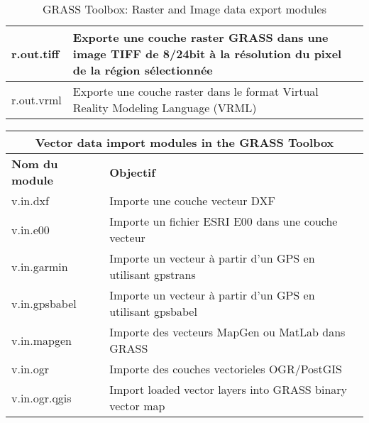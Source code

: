 \begin{table}[htb]
\begin{tabular}{|p{2.5cm}|p{11.5cm}|}
  \hline r.out.tiff & Exporte une couche raster GRASS dans une image TIFF de 8/24bit à la résolution du pixel de la région sélectionnée\\
  \hline r.out.vrml & Exporte une couche raster dans le format Virtual Reality Modeling Language (VRML)\\
\hline
\end{tabular}
\caption{GRASS Toolbox: Raster and Image data export modules}
\end{table}

\begin{table}[H]
\centering
 \begin{tabular}{|p{2.5cm}|p{11.5cm}|}
  \hline \multicolumn{2}{|c|}{\textbf{Vector data import modules in the GRASS
Toolbox}} \\
  \hline \textbf{Nom du module} & \textbf{Objectif} \\
  \hline v.in.dxf & Importe une couche vecteur DXF \\
  \hline v.in.e00 & Importe un fichier ESRI E00 dans une couche vecteur \\
  \hline v.in.garmin & Importe un vecteur à partir d'un GPS en utilisant gpstrans \\
  \hline v.in.gpsbabel & Importe un vecteur à partir d'un GPS en utilisant gpsbabel \\
  \hline v.in.mapgen & Importe des vecteurs MapGen ou MatLab dans GRASS \\
  \hline v.in.ogr & Importe des couches vectorieles OGR/PostGIS \\
  \hline v.in.ogr.qgis & Import loaded vector layers into GRASS binary
  vector map \\

\end{tabular}
\end{table}
